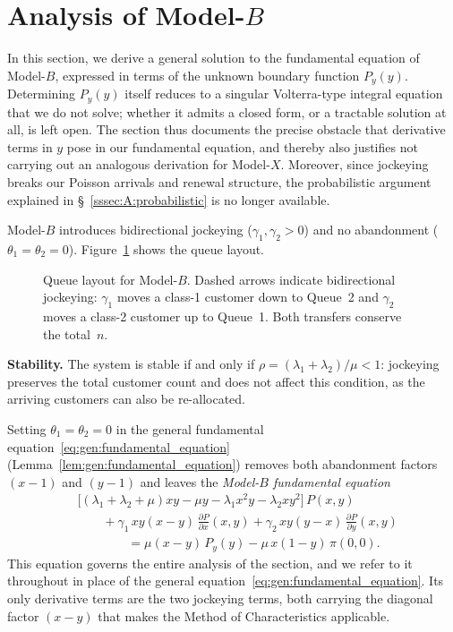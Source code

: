 \section{Analysis of Model-\texorpdfstring{$B$}{B}}\label{sec:model_b}

In this section, we derive a general solution to the fundamental equation of Model-$B$, expressed in terms of the unknown boundary function $P_y(y)$. Determining $P_y(y)$ itself reduces to a singular Volterra-type integral equation that we do not solve; whether it admits a closed form, or a tractable solution at all, is left open. The section thus documents the precise obstacle that derivative terms in $y$ pose in our fundamental equation, and thereby also justifies not carrying out an analogous derivation for Model-$X$. Moreover, since jockeying breaks our Poisson arrivals and renewal structure, the probabilistic argument explained in \S~\ref{sssec:A:probabilistic} is no longer available.

Model-$B$ introduces bidirectional jockeying ($\gamma_1,\gamma_2>0$) and no abandonment ($\theta_1=\theta_2=0$). Figure~\ref{fig:model-b-queue} shows the queue layout.
\begin{figure}[H]
    \centering
    \resizebox{0.62\textwidth}{!}{%
    }
    \caption{Queue layout for Model-$B$. Dashed arrows indicate bidirectional
    jockeying: $\gamma_1$ moves a class-1 customer down to Queue~2 and $\gamma_2$
    moves a class-2 customer up to Queue~1. Both transfers conserve the total~$n$.}
    \label{fig:model-b-queue}
\end{figure}

\textbf{Stability.} The system is stable if and only if $\rho = (\lambda_1+\lambda_2)/\mu < 1$: jockeying preserves the total customer count and does not affect this condition, as the arriving customers can also be re-allocated.

Setting $\theta_1=\theta_2=0$ in the general fundamental equation~\eqref{eq:gen:fundamental_equation} (Lemma~\ref{lem:gen:fundamental_equation}) removes both abandonment factors $(x-1)$ and $(y-1)$ and leaves the \emph{Model-$B$ fundamental equation}
\begin{equation}
\begin{split}
    & \bigl[(\lambda_1+\lambda_2+\mu)xy - \mu y - \lambda_1 x^2 y - \lambda_2 x y^2\bigr]\,P(x,y) \\
    & \qquad + \gamma_1\,xy(x-y)\,\frac{\partial P}{\partial x}(x,y)
             + \gamma_2\,xy(y-x)\,\frac{\partial P}{\partial y}(x,y) \\
    & \qquad\qquad = \mu(x-y)\,P_y(y) - \mu\,x(1-y)\,\pi(0,0).
\end{split}
\label{eq:B:fundamental}
\end{equation}
This equation governs the entire analysis of the section, and we refer to it throughout in place of the general equation~\eqref{eq:gen:fundamental_equation}. Its only derivative terms are the two jockeying terms, both carrying the diagonal factor $(x-y)$ that makes the Method of Characteristics applicable.

